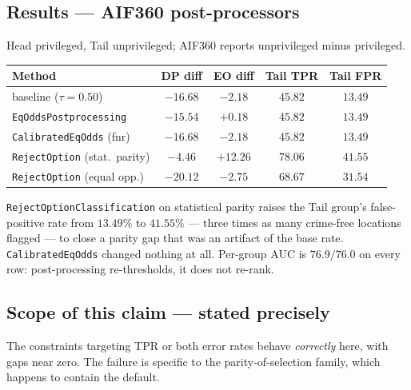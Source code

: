 \documentclass[11pt,a4paper]{article}
\begin{document}
\subsection{Results --- AIF360 post-processors}
Head privileged, Tail unprivileged; AIF360 reports unprivileged minus
privileged.
\begin{center}
\begin{tabular}{lcccc}
\toprule
Method & DP diff & EO diff & Tail TPR & \textbf{Tail FPR} \\
\midrule
baseline ($\tau = 0.50$) & $-16.68$ & $-2.18$ & $45.82$ & $13.49$ \\
\texttt{EqOddsPostprocessing} & $-15.54$ & $+0.18$ & $45.82$ & $13.49$ \\
\texttt{CalibratedEqOdds} (fnr) & $-16.68$ & $-2.18$ & $45.82$ & $13.49$ \\
\texttt{RejectOption} (stat.\ parity) & $-4.46$ & $+12.26$ & $78.06$ & $\mathbf{41.55}$ \\
\texttt{RejectOption} (equal opp.) & $-20.12$ & $-2.75$ & $68.67$ & $31.54$ \\
\bottomrule
\end{tabular}
\end{center}
\noindent \texttt{RejectOptionClassification} on statistical parity raises the
Tail group's false-positive rate from $13.49\%$ to $\mathbf{41.55\%}$ --- three
times as many crime-free locations flagged --- to close a parity gap that was an
artifact of the base rate. \texttt{CalibratedEqOdds} changed nothing at all.
Per-group AUC is $76.9 / 76.0$ on every row: post-processing re-thresholds, it
does not re-rank.

\subsection{Scope of this claim --- stated precisely}
The constraints targeting TPR or both error rates behave \emph{correctly} here,
with gaps near zero. The failure is specific to the parity-of-selection family,
which happens to contain the default.

\medskip
\noindent{}
\end{document}
